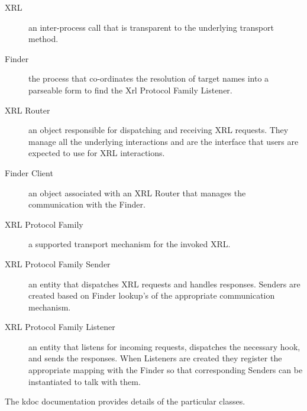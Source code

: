 \documentclass[11pt]{article}
\begin{document}
\begin{description}
\item [XRL] an inter-process call that is transparent to the
underlying transport method.

\item [Finder] the process that co-ordinates the resolution of target
names into a parseable form to find the Xrl Protocol Family Listener.

\item [XRL Router] an object responsible for dispatching and receiving
XRL requests.  They manage all the underlying interactions and are the
interface that users are expected to use for XRL interactions.

\item [Finder Client] an object associated with an XRL Router that
manages the communication with the Finder.

\item [XRL Protocol Family] a supported transport mechanism for the
invoked XRL.

\item [XRL Protocol Family Sender] an entity that dispatches XRL
requests and handles responses.  Senders are created based on Finder
lookup's of the appropriate communication mechanism.

\item [XRL Protocol Family Listener] an entity that listens for
incoming requests, dispatches the necessary hook, and sends the
responses.  When Listeners are created they register the appropriate
mapping with the Finder so that corresponding Senders can be
instantiated to talk with them.

\end{description}

The kdoc documentation provides details of the particular classes.
\end{document}
